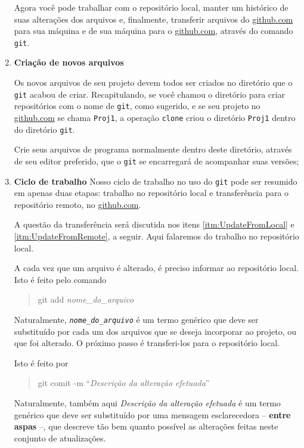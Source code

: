 \documentclass[10pt,a4paper]{article}
\begin{document}
\begin{enumerate}
	Agora você pode trabalhar com o repositório local, manter um histórico de suas alterações 
	dos arquivos e, finalmente, transferir arquivos do \url{github.com} para sua máquina e de 
	sua máquina para o \url{github.com}, através do comando {\tt git}.
                
    \item {\bf Criação de novos arquivos}

    	Os novos arquivos de seu projeto devem todos ser criados no diretório que o {\tt git} acabou de criar. Recapitulando, se você chamou o diretório para criar repositórios com o nome de {\tt git}, como sugerido, e se seu projeto no \url{github.com} se chama {\tt Proj1}, a operação {\tt clone} criou o diretório {\tt Proj1} dentro do diretório {\tt git}.
    	
    	Crie seus arquivos de programa normalmente dentro deste diretório, através de seu editor preferido, que o {\tt git} se encarregará de acompanhar suas versões;
                
    \item {\bf Ciclo de trabalho}
	Nosso ciclo de trabalho no uso do {\tt git} pode ser resumido em apenas duas etapas: 
	trabalho no repositório local e transferência para o repositório remoto, no 
	\url{github.com}. 
	
	A questão da transferência será discutida nos itens \ref{itm:UpdateFromLocal} e 
	\ref{itm:UpdateFromRemote}, a seguir. Aqui falaremos do trabalho no repositório local. 
	
	A cada vez que um arquivo é alterado, é preciso informar ao repositório local. Isto é feito 
	pelo comando
	\begin{quote}
	\begin{tt}
	    git add {\em nome\_do\_arquivo}
	\end{tt}
	\end{quote}

	Naturalmente, {\tt {\em nome\_do\_arquivo}} é um termo genérico que deve ser substituído 
	por cada um dos arquivos que se deseja incorporar ao projeto, ou que foi alterado. O 
	próximo passo é transferi-los para o repositório local. 
	
	Isto é feito por 
	\begin{quote}
	\begin{tt}
	    git comit -m ``{\em Descrição da alteração efetuada}''
	\end{tt}
	\end{quote}
        
	Naturalmente, também aqui {\em Descrição da alteração efetuada} é um termo genérico que 
	deve ser substituído por uma mensagem esclarecedora -- {\bf entre aspas} --, que descreve 
	tão bem quanto possível as alterações feitas neste conjunto de atualizações. 
	

\end{enumerate}
\end{document}
